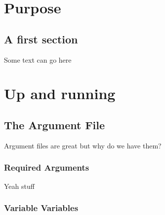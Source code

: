 \documentclass[10pt]{report}
\begin{document}
\chapter{Purpose}
\section{A first section}
Some text can go here
\chapter{Up and running}
\section{The Argument File}
Argument files are great but why do we have them?
\subsection{Required Arguments}
Yeah stuff
\subsection{Variable Variables}
\end{document}
